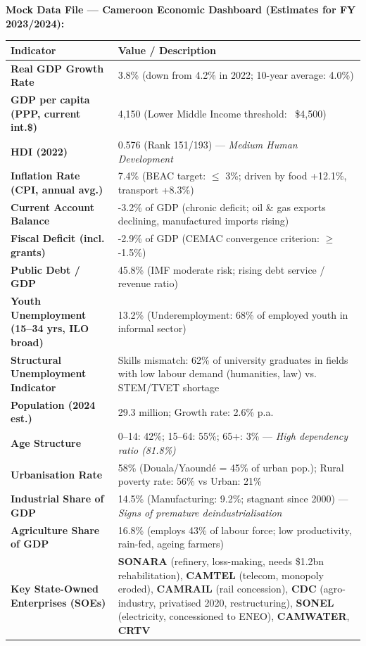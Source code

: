 \documentclass[11pt]{article}
\begin{document}
\textbf{Mock Data File — Cameroon Economic Dashboard (Estimates for FY 2023/2024):}
\begin{center}
\begin{tabularx}{\linewidth}{|l|X|}\hline
\rowcolor{popblueL}
\textbf{Indicator} & \textbf{Value / Description} \\ \hline
\textbf{Real GDP Growth Rate} & 3.8\% (down from 4.2\% in 2022; 10-year average: 4.0\%) \\ \hline
\textbf{GDP per capita (PPP, current int.\$)} & 4,150 (Lower Middle Income threshold: ~\$4,500) \\ \hline
\textbf{HDI (2022)} & 0.576 (Rank 151/193) — \emph{Medium Human Development} \\ \hline
\textbf{Inflation Rate (CPI, annual avg.)} & 7.4\% (BEAC target: $\le$ 3\%; driven by food +12.1\%, transport +8.3\%) \\ \hline
\textbf{Current Account Balance} & -3.2\% of GDP (chronic deficit; oil \& gas exports declining, manufactured imports rising) \\ \hline
\textbf{Fiscal Deficit (incl. grants)} & -2.9\% of GDP (CEMAC convergence criterion: $\ge$ -1.5\%) \\ \hline
\textbf{Public Debt / GDP} & 45.8\% (IMF moderate risk; rising debt service / revenue ratio) \\ \hline
\textbf{Youth Unemployment (15--34 yrs, ILO broad)} & 13.2\% (Underemployment: 68\% of employed youth in informal sector) \\ \hline
\textbf{Structural Unemployment Indicator} & Skills mismatch: 62\% of university graduates in fields with low labour demand (humanities, law) vs. STEM/TVET shortage \\ \hline
\textbf{Population (2024 est.)} & 29.3 million; Growth rate: 2.6\% p.a. \\ \hline
\textbf{Age Structure} & 0--14: 42\%; 15--64: 55\%; 65+: 3\% — \emph{High dependency ratio (81.8\%)} \\ \hline
\textbf{Urbanisation Rate} & 58\% (Douala/Yaoundé = 45\% of urban pop.); Rural poverty rate: 56\% vs Urban: 21\% \\ \hline
\textbf{Industrial Share of GDP} & 14.5\% (Manufacturing: 9.2\%; stagnant since 2000) — \emph{Signs of premature deindustrialisation} \\ \hline
\textbf{Agriculture Share of GDP} & 16.8\% (employs 43\% of labour force; low productivity, rain-fed, ageing farmers) \\ \hline
\textbf{Key State-Owned Enterprises (SOEs)} & \textbf{SONARA} (refinery, loss-making, needs \$1.2bn rehabilitation), \textbf{CAMTEL} (telecom, monopoly eroded), \textbf{CAMRAIL} (rail concession), \textbf{CDC} (agro-industry, privatised 2020, restructuring), \textbf{SONEL} (electricity, concessioned to ENEO), \textbf{CAMWATER}, \textbf{CRTV} \\ \hline

\end{tabularx}
\end{center}
\end{document}
